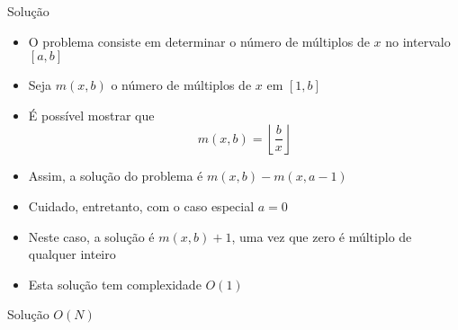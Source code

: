 \begin{frame}[fragile]{Solução}

    \begin{itemize}
        \item O problema consiste em determinar o número de múltiplos de $x$ no intervalo
            $[a, b]$

        \item Seja $m(x, b)$ o número de múltiplos de $x$ em $[1, b]$

        \item É possível mostrar que
        \[
            m(x, b) = \left\lfloor \frac{b}{x}\right\rfloor
        \]

        \item Assim, a solução do problema é $m(x, b) - m(x, a - 1)$

        \item Cuidado, entretanto, com o caso especial $a = 0$

        \item Neste caso, a solução é $m(x, b) + 1$, uma vez que zero é múltiplo de qualquer
            inteiro
    
        \item Esta solução tem complexidade $O(1)$
    \end{itemize}

\end{frame}

\begin{frame}[fragile]{Solução $O(N)$}
\end{frame}
